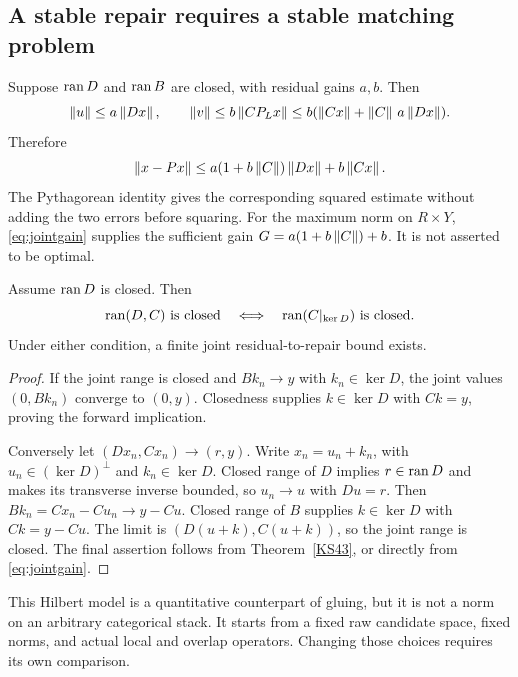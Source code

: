 \subsection{A stable repair requires a stable matching problem}
Suppose \(\operatorname{ran} D\) and \(\operatorname{ran} B\) are closed, with residual gains \(a,b\). Then
\[
 \left\lVert u\right\rVert\le a\left\lVert Dx\right\rVert,\qquad
 \left\lVert v\right\rVert\le b\left\lVert CP_Lx\right\rVert
 \le b(\left\lVert Cx\right\rVert+\left\lVert C\right\rVert\,a\left\lVert Dx\right\rVert).
\]
Therefore
\begin{equation}\label{eq:jointgain}
 \left\lVert x-Px\right\rVert\le
 a(1+b\left\lVert C\right\rVert)\left\lVert Dx\right\rVert+b\left\lVert Cx\right\rVert.
\end{equation}
The Pythagorean identity gives the corresponding squared estimate without adding the two errors before squaring. For the maximum norm on \(R\times Y\), \eqref{eq:jointgain} supplies the sufficient gain \(G=a(1+b\left\lVert C\right\rVert)+b\). It is not asserted to be optimal.

\begin{theorem}\label{KS47}
Assume \(\operatorname{ran} D\) is closed. Then
\[
 \operatorname{ran}(D,C)\text{ is closed}\quad\Longleftrightarrow\quad
 \operatorname{ran}(C|_{\ker D})\text{ is closed}.
\]
Under either condition, a finite joint residual-to-repair bound exists.
\end{theorem}
\begin{proof}
If the joint range is closed and \(Bk_n\to y\) with \(k_n\in\ker D\), the joint values \((0,Bk_n)\) converge to \((0,y)\). Closedness supplies \(k\in\ker D\) with \(Ck=y\), proving the forward implication.

Conversely let \((Dx_n,Cx_n)\to(r,y)\). Write \(x_n=u_n+k_n\), with \(u_n\in(\ker D)^\perp\) and \(k_n\in\ker D\). Closed range of \(D\) implies \(r\in\operatorname{ran} D\) and makes its transverse inverse bounded, so \(u_n\to u\) with \(Du=r\). Then \(Bk_n=Cx_n-Cu_n\to y-Cu\). Closed range of \(B\) supplies \(k\in\ker D\) with \(Ck=y-Cu\). The limit is \((D(u+k),C(u+k))\), so the joint range is closed. The final assertion follows from Theorem~\ref{KS43}, or directly from \eqref{eq:jointgain}.
\end{proof}


This Hilbert model is a quantitative counterpart of gluing, but it is not a norm on an arbitrary categorical stack. It starts from a fixed raw candidate space, fixed norms, and actual local and overlap operators. Changing those choices requires its own comparison.

